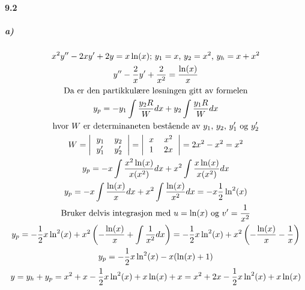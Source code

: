 \documentclass[11pt, A4paper,norsk]{article}
\begin{document}
		\paragraph{9.2}
			\subparagraph{a)}
				\begin{gather*}
x^2 y'' - 2 x y' + 2 y = x \ln(x) \text{; } y_1 = x \text{, } y_2 = x^2 \text{, } y_h = x + x^2 \\
y'' - \frac{2}{x} y' + \frac{2}{x^2} = \frac{\ln(x)}{x} \\
\text{Da er den partikkulære løsningen gitt av formelen} \\
y_p = - y_1 \int \frac{y_2 R}{W} dx + y_2 \int \frac{y_1 R}{W} dx \\
\text{hvor $W$ er determinaneten bestående av $y_1$, $y_2$, $y_1'$ og $y_2'$} \\
W = \left|
\begin{tabular}{ cc }
$y_1$ & $y_2$ \\
$y_1'$ & $y_2'$
\end{tabular}
\right| = \left|
\begin{tabular}{ cc }
$x$ & $x^2$ \\
$1$ & $2x$
\end{tabular}
\right| = 2x^2 - x^2 = x^2 \\
y_p = - x \int \frac{x^2 \ln(x)}{x (x^2)} dx + x^2 \int \frac{x \ln(x)}{x (x^2)} dx \\
y_p = - x \int \frac{\ln(x)}{x} dx + x^2 \int \frac{\ln(x)}{x^2} dx = - x \frac{1}{2} \ln^2(x) \\
\text{Bruker delvis integrasjon med $u = \ln(x)$ og $v' = \frac{1}{x^2}$} \\
y_p = - \frac{1}{2} x \ln^2(x) + x^2 \left( - \frac{\ln(x)}{x} + \int \frac{1}{x^2} dx \right) = - \frac{1}{2} x \ln^2(x) + x^2 \left( - \frac{\ln(x)}{x} - \frac{1}{x} \right) \\
y_p = - \frac{1}{2} x \ln^2(x) - x (\ln(x) + 1) \\
y = y_h + y_p = x^2 + x - \frac{1}{2} x \ln^2(x) + x \ln(x) + x = x^2 + 2 x - \frac{1}{2} x \ln^2(x) + x \ln(x)
				\end{gather*}
\end{document}
